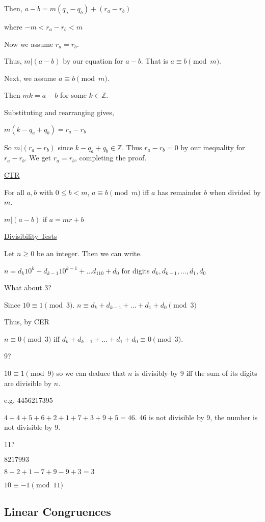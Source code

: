 \documentclass{article}
\begin{document}
Then, $a-b = m(q_a-q_b)+(r_a-r_b)$ 

where $-m < r_a - r_b < m$

Now we assume $r_a = r_b$.

Thus, $m \vert (a-b)$ by our equation for $a-b$. That is $a \equiv b \pmod{m}$. 

Next, we assume $a \equiv b \pmod{m}$. 

Then $mk = a-b$ for some $k \in \mathbb{Z}$. 

Substituting and rearranging gives,

$m(k-q_a + q_b) = r_a - r_b$

So $m \vert (r_a - r_b)$ since $k - q_a + q_b \in \mathbb{Z}$. Thus $r_a - r_b = 0$ by our inequality for $r_a - r_b$. We get $r_a = r_b$, completing the proof. 

\underline{CTR}

For all $a,b$ with $0 \le b < m$, $a \equiv b \pmod{m}$ iff $a$ has remainder $b$ when divided by $m$. 

$m \vert (a -b)$ if $a = mr + b$

\underline{Divisibility Tests}

Let $n \ge 0$ be an integer. Then we can write.

$n = d_k10^k + d_{k-1}10^{k-1} + \ldots d_110 + d_0$ for digits $d_k, d_{k-1}, \ldots, d_1, d_0$

What about 3?

Since $10 \equiv 1 \pmod{3}$. $n \equiv d_k + d_{k-1} + \ldots + d_1 + d_0 \pmod{3}$

Thus, by CER

$n \equiv 0 \pmod{3}$ iff $d_k + d_{k-1} + \ldots + d_1 + d_0 \equiv 0 \pmod{3}$.

9?

$10 \equiv 1 \pmod{9}$ so we can deduce that $n$ is divisibly by 9 iff the sum of its digits are divisible by $n$. 

e.g. 4456217395

$4+4+5+6+2+1+7+3+9+5=46$. 46 is not divisible by 9, the number is not divisible by 9. 

11?

$8217993$

$8-2+1-7+9-9+3 = 3$

$10 \equiv -1 \pmod{11}$

\subsection{Linear Congruences}
\end{document}
